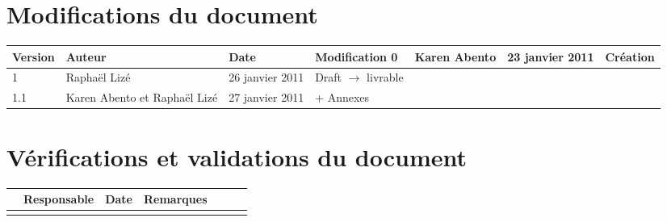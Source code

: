 
\section*{Modifications du document}

\begin{center}
\begin{longtable}{|m{14mm}||m{36mm}|m{36mm}|m{60mm}|}
\hline
Version & Auteur & Date & Modification\endhead \hline
0
& %
Karen Abento
& %
23 janvier 2011
& %
Création
\\\hline
1
& %
Raphaël Lizé
& %
26 janvier 2011
& %
Draft $\rightarrow$ livrable
\\\hline
1.1
& %
Karen Abento et Raphaël Lizé
& %
27 janvier 2011
& %
+ Annexes
\\\hline
\end{longtable}
\end{center}


\section*{Vérifications et validations du document}

\begin{center}
\begin{longtable}{|m{15mm}|m{36mm}|m{36mm}|m{60mm}|}
\hline
 & Responsable & Date & Remarques\endhead \hline

& %

& %

& %

\\\hline

& %

& %

& %

\\\hline
\end{longtable}
\end{center}

\pagebreak
